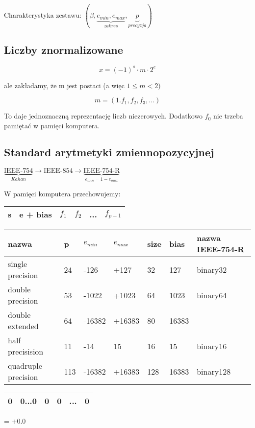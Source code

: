 \documentclass[hidelinks,a4paper,fleqn]{article}
\begin{document}
Charakterystyka zestawu: $(\beta, \underbrace{e_{min}, e_{max}}_{zakres}, \underbrace{p}_{precyzja})$

\subsection{Liczby znormalizowane}

\[
	x = (-1)^s \cdot m \cdot 2^e
\]

ale zakładamy, że m jest postaci (a więc $1 \leq m < 2)$

\[
	m = (1.f_1,f_2,f_3,...)
\]

To daje jednoznaczną reprezentację liczb niezerowych. Dodatkowo $f_0$ nie trzeba pamiętać w pamięci komputera.

\subsection{Standard arytmetyki zmiennopozycyjnej}

$\underbrace{\textrm{IEEE-754}}_{Kahan} \rightarrow \textrm{IEEE-854} \rightarrow \underbrace{\textrm{IEEE-754-R}}_{e_{min} = 1 - e_{max}}$

W pamięci komputera przechowujemy:

\begin{tabular}{|c|c|l|l|l|c|c|c|l|c|}
	\hline
	s & \multicolumn{4}{c|}{e + bias} & $f_1$ & $f_2$ & \multicolumn{2}{c|}{...} & $f_{p-1}$ \\ \hline
\end{tabular}


\begin{longtable}[c]{l|l|l|l|l|l|l}
	nazwa               & p   & $e_{min}$ & $e_{max}$ & size & bias  & nazwa IEEE-754-R \\ \hline
	\endfirsthead
	\endhead
	single precision    & 24  & -126      & +127      & 32   & 127   & binary32         \\ \hline
	double precision    & 53  & -1022     & +1023     & 64   & 1023  & binary64         \\ \hline
	double extended     & 64  & -16382    & +16383    & 80   & 16383 &                  \\ \hline
	half precisision    & 11  & -14       & 15        & 16   & 15    & binary16         \\ \hline
	quadruple precision & 113 & -16382    & +16383    & 128  & 16383 & binary128        
\end{longtable}

\begin{tabular}{|c|c|l|l|l|c|c|c|l|c|}
	\hline
	0 & \multicolumn{4}{c|}{0...0} & 0 & 0 & \multicolumn{2}{c|}{...} & 0 \\ \hline
\end{tabular} = $+0.0$
\end{document}
